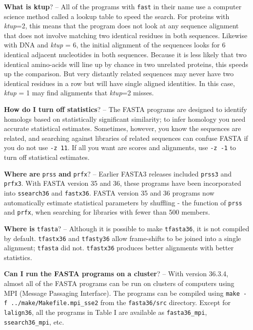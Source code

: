 \documentclass[11pt]{article}
\begin{document}
\vspace{0.5ex}
{\noindent}\textbf{What is ktup}? -- All of the programs with \texttt{fast} in their
name use a computer science method called a lookup table to speed the
search.  For proteins with \emph{ktup}=2, this means that the program
does not look at any sequence alignment that does not involve matching
two identical residues in both sequences.  Likewise with DNA and
\emph{ktup} = 6, the initial alignment of the sequences looks for 6
identical adjacent nucleotides in both sequences.  Because it is less
likely that two identical amino-acids will line up by chance in two
unrelated proteins, this speeds up the comparison.  But very distantly
related sequences may never have two identical residues in a row but
will have single aligned identities.  In this case, \emph{ktup} = 1 may
find alignments that \emph{ktup}=2 misses.

\vspace{0.5ex} {\noindent}\textbf{How do I turn off statistics}? --
The FASTA programs are designed to identify homologs based on
statistically significant similarity; to infer homology you need
accurate statistical estimates.  Sometimes, however, you know the
sequences are related, and searching against libraries of related
sequences can confuse FASTA if you do not use \texttt{-z 11}. If all
you want are scores and alignments, use \texttt{-z -1} to turn off
statistical estimates.

\vspace{0.5ex}
{\noindent}\textbf{Where are} \texttt{prss} {\noindent}\textbf{and} \texttt{prfx}? -- Earlier FASTA3
releases included \texttt{prss3} and \texttt{prfx3}. With FASTA
version 35 and 36, these programs have been incorporated into
\texttt{ssearch36} and \texttt{fastx36}.  FASTA version 35 and 36
programs now automatically estimate statistical parameters by
shuffling - the function of \texttt{prss} and \texttt{prfx}, when
searching for libraries with fewer than 500 members.

\vspace{0.5ex}
{\noindent}\textbf{Where is} \texttt{tfasta}? -- Although it is possible to make
\texttt{tfasta36}, it is not compiled by default.  \texttt{tfastx36}
and \texttt{tfasty36} allow frame-shifts to be joined into a single
alignment; \texttt{tfasta} did not. \texttt{tfastx36} produces better
alignments with better statistics.

\vspace{0.5ex}
{\noindent}\textbf{Can I run the FASTA programs on a cluster}? -- With version
36.3.4, almost all of the FASTA programs can be run on clusters of
computers using MPI (Message Passaging Interface).  The programs can
be compiled using \texttt{make -f ../make/Makefile.mpi\_sse2} from the
\texttt{fasta36/src} directory.  Except for \texttt{lalign36}, all the
programs in Table I are available as \texttt{fasta36\_mpi},
\texttt{ssearch36\_mpi}, etc.
\end{document}
